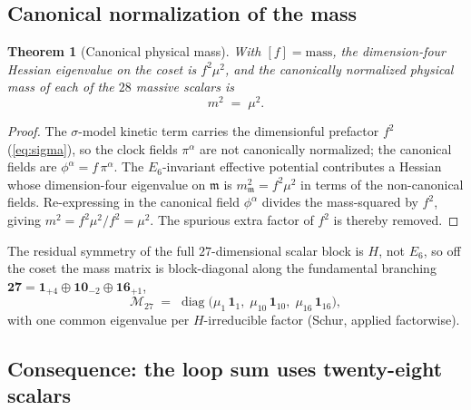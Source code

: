 \documentclass[11pt]{article}
\theoremstyle{plain}
\newtheorem{theorem}{Theorem}[section]
\theoremstyle{definition}
\theoremstyle{remark}
\begin{document}
\subsection{Canonical normalization of the mass}
\label{sec:masses:canonical}

\begin{theorem}[Canonical physical mass]\label{thm:masses:canonical}
With $[f]=\text{mass}$, the dimension-four Hessian eigenvalue on the coset is
$f^{2}\mu^{2}$, and the canonically normalized physical mass of each of the
$28$ massive scalars is
\begin{equation}\label{eq:masses:m2}
  m^{2} \;=\; \mu^{2}.
\end{equation}
\end{theorem}

\begin{proof}
The $\sigma$-model kinetic term carries the dimensionful prefactor $f^{2}$
(\autoref{eq:sigma}), so the clock fields $\pi^{\alpha}$ are not canonically
normalized; the canonical fields are $\phi^{\alpha}=f\,\pi^{\alpha}$. The
$E_{6}$-invariant effective potential contributes a Hessian whose dimension-four
eigenvalue on $\mathfrak m$ is $m_{\mathfrak m}^{2}=f^{2}\mu^{2}$ in terms of
the non-canonical fields. Re-expressing in the canonical field $\phi^{\alpha}$
divides the mass-squared by $f^{2}$, giving $m^{2}=f^{2}\mu^{2}/f^{2}=\mu^{2}$.
The spurious extra factor of $f^{2}$ is thereby removed.
\end{proof}

The residual symmetry of the full $27$-dimensional scalar block is $H$, not
$E_{6}$, so off the coset the mass matrix is block-diagonal along the
fundamental branching
$\mathbf{27}=\mathbf 1_{+4}\oplus\mathbf{10}_{-2}\oplus\mathbf{16}_{+1}$,
\begin{equation}\label{eq:masses:27block}
  \mathcal{M}_{27}
  \;=\;
  \operatorname{diag}\!\bigl(\mu_{1}\,\mathbf 1_{1},\;
  \mu_{10}\,\mathbf 1_{10},\;\mu_{16}\,\mathbf 1_{16}\bigr),
\end{equation}
with one common eigenvalue per $H$-irreducible factor (Schur, applied factorwise).

\subsection{Consequence: the loop sum uses twenty-eight scalars}
\label{sec:masses:loopsum}
\end{document}
